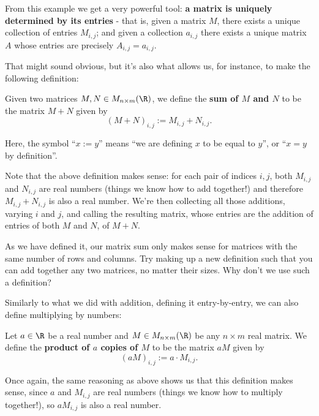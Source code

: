 From this example we get a very powerful tool: \textbf{a matrix is uniquely determined by its entries} - that is, given a matrix $M$, there exists a unique collection of entries $M_{i,j}$; and given a collection $a_{i,j}$ there exists a unique matrix $A$ whose entries are precisely $A_{i,j}=a_{i,j}$.

That might sound obvious, but it's also what allows us, for instance, to make the following definition:

\begin{df}
	Given two matrices $M,N\in M_{n\times m}(\R)$, we define the \textbf{sum of $M$ and $N$} to be the matrix $M+N$ given by
	\[(M+N)_{i,j}:= M_{i,j}+N_{i,j}.\]
\end{df}
\begin{rmk}
	Here, the symbol ``$x:=y$'' means ``we are defining $x$ to be equal to $y$'', or ``$x=y$ by definition''.
\end{rmk}
\begin{rmk}
	Note that the above definition makes sense: for each pair of indices $i,j$, both $M_{i,j}$ and $N_{i,j}$ are real numbers (things we know how to add together!) and therefore $M_{i,j}+N_{i,j}$ is also a real number. We're then collecting all those additions, varying $i$ and $j$, and calling the resulting matrix, whose entries are the addition of entries of both $M$ and $N$, of $M+N$.
\end{rmk}
\begin{exerc}
	As we have defined it, our matrix sum only makes sense for matrices with the same number of rows and columns. Try making up a new definition such that you can add together any two matrices, no matter their sizes. Why don't we use such a definition?
\end{exerc}

Similarly to what we did with addition, defining it entry-by-entry, we can also define multiplying by numbers:

\begin{df}
	Let $a\in \R$ be a real number and $M\in M_{n\times m}(\R)$ be any $n\times m$ real matrix. We define the \textbf{product of $a$ copies of $M$} to be the matrix $aM$ given by
	\[(aM)_{i,j}:=a\cdot M_{i,j}.\]
\end{df}

Once again, the same reasoning as above shows us that this definition makes sense, since $a$ and $M_{i,j}$ are real numbers (things we know how to multiply together!), so $aM_{i,j}$ is also a real number.

